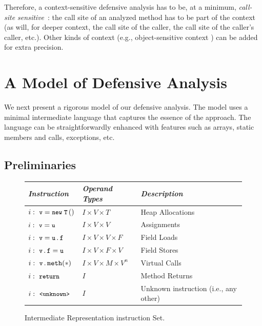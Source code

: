 Therefore, a context-sensitive defensive analysis has to be, at a
minimum, \emph{call-site
  sensitive}~\cite{Sharir:Interprocedural,shivers:thesis}: the call
site of an analyzed method has to be part of the context (as will, for
deeper context, the call site of the caller, the call site of the
caller's caller, etc.).  Other kinds of context (e.g.,
object-sensitive context \cite{1044835,popl/SmaragdakisBL11}) can be added for extra
precision.


\section{A Model of Defensive Analysis}
\label{sec:model}

We next present a rigorous model of our defensive analysis.  The model
uses a minimal intermediate language that captures the essence of the
approach. The language can be straightforwardly enhanced with
features such as arrays, static members and calls, exceptions, etc. 

\subsection{Preliminaries}

\begin{figure}[t]
  \centering
  \begin{tabular}{l@{\quad}l@{\qquad}l}
    \toprule
    \emph{Instruction}
    & \emph{Operand Types}
    & \emph{Description} \\
    \midrule
    \(\newinstr[i]{v}{T}\)
    & \(I \!\times\! V \!\times\! T\)
    & Heap Allocations
    \\
    \(\moveinstr[i]{v}{u}\)
    & \(I \!\times\! V \!\times\! V\)
    & Assignments
    \\
    \(\fldloadinstr[i]{v}{u}{f}\)
    & \(I \!\times\! V \!\times\! V \!\times\! F\)
    & Field Loads
    \\
    \(\fldstoreinstr[i]{v}{f}{u}\)
    & \(I \!\times\! V \!\times\! F \!\times\! V\)
    & Field Stores
    \\
    \(\vcallinstr[i]{v}{meth}\)
    & \(I \!\times\! V \!\times\! M \!\times\! V^n\)
    & Virtual Calls
    \\
    \(\returninstr[i]{}\)
    & \(I\)
    & Method Returns
    \\
    \(\unknowninstr[i]\)
    & \(I\)
    & Unknown instruction (i.e., any other)
    \\
    \bottomrule
  \end{tabular}
  \caption{%
    Intermediate Representation instruction Set.  %
  }
  \label{fig/javair}
\end{figure}

